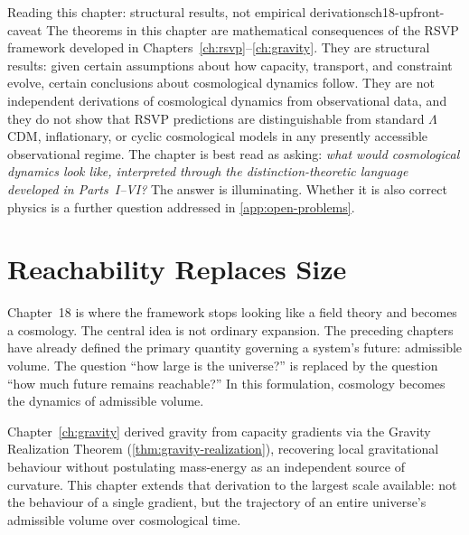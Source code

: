 \documentclass[12pt,twoside,openright]{book}
\begin{document}
\begin{remark}{Reading this chapter: structural results,
  not empirical derivations}{ch18-upfront-caveat}
  The theorems in this chapter are mathematical consequences
  of the RSVP framework developed in
  Chapters~\ref{ch:rsvp}--\ref{ch:gravity}. They are
  structural results: given certain assumptions about how
  capacity, transport, and constraint evolve, certain
  conclusions about cosmological dynamics follow. They are
  not independent derivations of cosmological dynamics
  from observational data, and they do not show that RSVP
  predictions are distinguishable from standard
  $\Lambda$CDM, inflationary, or cyclic cosmological
  models in any presently accessible observational regime.
  The chapter is best read as asking: \emph{what would
  cosmological dynamics look like, interpreted through the
  distinction-theoretic language developed in Parts~I--VI?}
  The answer is illuminating. Whether it is also correct
  physics is a further question addressed in
  \cref{app:open-problems}.
\end{remark}

\section{Reachability Replaces Size}
\label{sec:ch18-replaces}

Chapter~18 is where the framework stops looking like a
field theory and becomes a cosmology. The central idea is
not ordinary expansion. The preceding chapters have already
defined the primary quantity governing a system's future:
admissible volume. The question ``how large is the
universe?'' is replaced by the question ``how much future
remains reachable?'' In this formulation, cosmology becomes
the dynamics of admissible volume.

Chapter~\ref{ch:gravity} derived gravity from capacity
gradients via the Gravity Realization Theorem
(\cref{thm:gravity-realization}), recovering local
gravitational behaviour without postulating mass-energy as an
independent source of curvature. This chapter extends that
derivation to the largest scale available: not the behaviour
of a single gradient, but the trajectory of an entire
universe's admissible volume over cosmological time.
\end{document}

